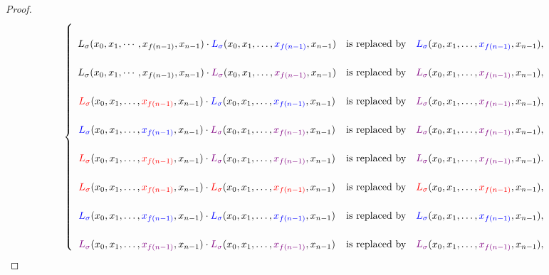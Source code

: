 \begin{proof}
\[\begin{cases}
\begin{array}{ccc}
\\
L_{\sigma}(x_{0},x_{1},\cdots,x_{f(n-1)},x_{n-1})\cdot{\color{blue}L_{\sigma}}(x_{0},x_{1},\ldots,{\color{blue}x_{f(n-1)}},x_{n-1}) & \text{is replaced by} & {\color{blue}L_{\sigma}}(x_{0},x_{1},\ldots,{\color{blue}x_{f(n-1)}},x_{n-1}),\\
\\
L_{\sigma}(x_{0},x_{1},\cdots,x_{f(n-1)},x_{n-1})\cdot{\color{violet}L_{\sigma}}(x_{0},x_{1},\ldots,{\color{violet}x_{f(n-1)}},x_{n-1}) & \text{is replaced by} & {\color{violet}L_{\sigma}}(x_{0},x_{1},\ldots,{\color{violet}x_{f(n-1)}},x_{n-1}),\\
\\
{\color{red}L_{\sigma}}(x_{0},x_{1},\ldots,{\color{red}x_{f(n-1)}},x_{n-1})\cdot{\color{blue}L_{\sigma}}(x_{0},x_{1},\ldots,{\color{blue}x_{f(n-1)}},x_{n-1}) & \text{is replaced by} & {\color{violet}L_{\sigma}}(x_{0},x_{1},\ldots,{\color{violet}x_{f(n-1)}},x_{n-1}),\\
\\
{\color{blue}L_{\sigma}}(x_{0},x_{1},\ldots,{\color{blue}x_{f(n-1)}},x_{n-1})\cdot{\color{violet}L_{\sigma}}(x_{0},x_{1},\ldots,{\color{violet}x_{f(n-1)}},x_{n-1}) & \text{is replaced by} & {\color{violet}L_{\sigma}}(x_{0},x_{1},\ldots,{\color{violet}x_{f(n-1)}},x_{n-1}),\\
\\
{\color{red}L_{\sigma}}(x_{0},x_{1},\ldots,{\color{red}x_{f(n-1)}},x_{n-1})\cdot{\color{violet}L_{\sigma}}(x_{0},x_{1},\ldots,{\color{violet}x_{f(n-1)}},x_{n-1}) & \text{is replaced by} & {\color{violet}L_{\sigma}}(x_{0},x_{1},\ldots,{\color{violet}x_{f(n-1)}},x_{n-1}).\\
\\
{\color{red}L_{\sigma}}(x_{0},x_{1},\ldots,{\color{red}x_{f(n-1)}},x_{n-1})\cdot{\color{red}L_{\sigma}}(x_{0},x_{1},\ldots,{\color{red}x_{f(n-1)}},x_{n-1}) & \text{is replaced by} & {\color{red}L_{\sigma}}(x_{0},x_{1},\ldots,{\color{red}x_{f(n-1)}},x_{n-1}),\\
\\
{\color{blue}L_{\sigma}}(x_{0},x_{1},\ldots,{\color{blue}x_{f(n-1)}},x_{n-1})\cdot{\color{blue}L_{\sigma}}(x_{0},x_{1},\ldots,{\color{blue}x_{f(n-1)}},x_{n-1}) & \text{is replaced by} & {\color{blue}L_{\sigma}}(x_{0},x_{1},\ldots,{\color{blue}x_{f(n-1)}},x_{n-1}),\\
\\
{\color{violet}L_{\sigma}}(x_{0},x_{1},\ldots,{\color{violet}x_{f(n-1)}},x_{n-1})\cdot{\color{violet}L_{\sigma}}(x_{0},x_{1},\ldots,{\color{violet}x_{f(n-1)}},x_{n-1}) & \text{is replaced by} & {\color{violet}L_{\sigma}}(x_{0},x_{1},\ldots,{\color{violet}x_{f(n-1)}},x_{n-1}),

\end{array}
\end{cases}\]
\end{proof}
